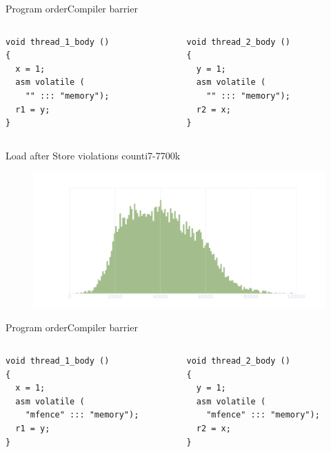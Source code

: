 \documentclass[aspectratio=169,compress]{beamer}
\begin{document}
\begin{frame}[fragile]{Program order}{Compiler barrier}
	\begin{columns}[T]
			\begin{column}{0.45\textwidth}
\begin{lstlisting}[title={Thread 1}]
void thread_1_body ()
{
  x = 1;
  asm volatile (
    "" ::: "memory");
  r1 = y;
}
\end{lstlisting}
\end{column}

\begin{column}{0.45\textwidth}
\begin{lstlisting}[title={Thread 2}]
void thread_2_body ()
{
  y = 1;
  asm volatile (
    "" ::: "memory");
  r2 = x;
}
\end{lstlisting}
			\end{column}
	\end{columns}

\end{frame}

\begin{frame}[fragile]{Load after Store violations count}{i7-7700k}
\centering
	\begin{figure}
		\includegraphics[width=\textwidth]{sc_violations_hist.pdf}
	\end{figure}
\end{frame}

\begin{frame}[fragile]{Program order}{Compiler barrier}
	\begin{columns}[T]
			\begin{column}{0.45\textwidth}
\begin{lstlisting}[title={Thread 1}]
void thread_1_body ()
{
  x = 1;
  asm volatile (
    "mfence" ::: "memory");
  r1 = y;
}
\end{lstlisting}
\end{column}

\begin{column}{0.45\textwidth}
\begin{lstlisting}[title={Thread 2}]
void thread_2_body ()
{
  y = 1;
  asm volatile (
    "mfence" ::: "memory");
  r2 = x;
}
\end{lstlisting}
			\end{column}
	\end{columns}

\end{frame}
\end{document}
